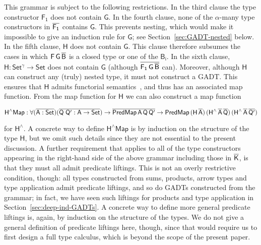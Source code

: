 \documentclass[9pt]{entcs}
\begin{document}
\noindent
This grammar is subject to the following restrictions. In the third
clause the type constructor $\mathsf{F_1}$ does not contain
$\mathsf{G}$. In the fourth clause, none of the $\mathsf{\alpha}$-many
type constructors in $\mathsf{\overline{F_1}}$ contains $\mathsf{G}$.  This
prevents nesting, which would make it impossible to give an induction
rule for $\mathsf{G}$; see Section~\ref{sec:GADT-nested} below. In the
fifth clause, $\mathsf{H}$ does not contain $\mathsf{G}$. This clause
therefore subsumes the cases in which $\mathsf{F\,G\,\overline{B}}$ is a
closed type or one of the $\mathsf{B_i}$. In the sixth clause,
$\mathsf{H : Set^\gamma \to Set}$ does not contain $\mathsf{G}$
(although $\overline{\mathsf{F_1\,G\,\overline{B}}}$ can). Moreover, although
$\mathsf{H}$ can construct any (truly) nested type, it must not
construct a GADT. This ensures that $\mathsf{H}$ admits functorial
semantics~\cite{jp20}, and thus has an associated map function. From
the map function for $\mathsf{H}$ we can also construct a map function

\vspace*{-0.05in}

\begin{equation}\label{eq:hliftmap}
\mathsf{H^\wedge Map : \forall (\overline{A : Set}) (\overline{Q\;Q' : A \to Set}) 
\to \overline{PredMap\,A\,Q\,Q'} \to
PredMap\,(H\,\overline{A})\,(H^{\wedge}\,\overline{A}\,\overline{Q})\, 
(H^{\wedge}\,\overline{A}\,\overline{Q'})}
\end{equation}

\vspace*{0.05in}

\noindent
for $\mathsf{H^{\wedge}}$. A concrete way to define $\mathsf{H^\wedge
  Map}$ is by induction on the structure of the type $\mathsf{H}$, but
we omit such details since they are not essential to the present
discussion. A further requirement that applies to all of the type
constructors appearing in the right-hand side of the above grammar
including those in $\overline{\mathsf{K}}$, is that they must all admit
predicate liftings. This is not an overly restrictive condition,
though: all types constructed from sums, products, arrow types and
type application admit predicate liftings, and so do GADTs constructed
from the grammar; in fact, we have seen such liftings for products and
type application in Section~\ref{sec:deep-ind-GADTs}. A concrete way
to define more general predicate liftings is, again, by induction on
the structure of the types. We do not give a general definition of
predicate liftings here, though, since that would require us to first
design a full type calculus, which is beyond the scope of the present
paper.
\end{document}
